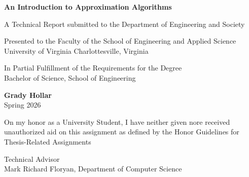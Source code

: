 \documentclass{article}
\begin{document}
\setlength{\abovedisplayskip}{4pt}
\setlength{\belowdisplayskip}{4pt}





\begin{titlepage}
    \hspace{0pt}
    \vspace{-2ex}

    \begin{center}
        \Large
        {\textbf{An Introduction to Approximation Algorithms}}\\

        \normalsize
        \vspace{30ex}

        A Technical Report submitted to the Department of Engineering and Society\\

        \vspace{10ex}

        Presented to the Faculty of the School of Engineering and Applied Science\\
        University of Virginia \raisebox{0.3ex}{\tiny$\bullet$} Charlottesville, Virginia\\

        \vspace{10ex}

        In Partial Fulfillment of the Requirements for the Degree\\
        Bachelor of Science, School of Engineering\\

        \vspace{20ex}

        \textbf{Grady Hollar}\\
        Spring 2026\\

        \vspace{20ex}

        On my honor as a University Student, I have neither given nore received unauthorized aid on this assignment as defined by the Honor Guidelines for Thesis-Related Assignments\\

        \vspace{10ex}

        Technical Advisor\\
        Mark Richard Floryan, Department of Computer Science
    \end{center}
\end{titlepage}
\end{document}
